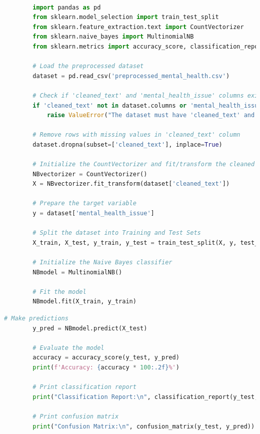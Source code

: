 \begin{tcolorbox}[colback=gray!5!white, colframe=gray!80!black, boxrule=0.5pt, title=Naive Bayes for Mental Health Classification]
    \begin{lstlisting}[language=Python]

        import pandas as pd
        from sklearn.model_selection import train_test_split
        from sklearn.feature_extraction.text import CountVectorizer
        from sklearn.naive_bayes import MultinomialNB
        from sklearn.metrics import accuracy_score, classification_report, confusion_matrix
        
        # Load the preprocessed dataset
        dataset = pd.read_csv('preprocessed_mental_health.csv')
        
        # Check if 'cleaned_text' and 'mental_health_issue' columns exist
        if 'cleaned_text' not in dataset.columns or 'mental_health_issue' not in dataset.columns:
            raise ValueError("The dataset must have 'cleaned_text' and 'mental_health_issue' columns.")
        
        # Remove rows with missing values in 'cleaned_text' column
        dataset.dropna(subset=['cleaned_text'], inplace=True)
        
        # Initialize the CountVectorizer and fit/transform the cleaned text
        NBvectorizer = CountVectorizer()
        X = NBvectorizer.fit_transform(dataset['cleaned_text'])
        
        # Prepare the target variable
        y = dataset['mental_health_issue']
        
        # Split the dataset into Training and Test Sets
        X_train, X_test, y_train, y_test = train_test_split(X, y, test_size=0.2, random_state=42)
        
        # Initialize the Naive Bayes classifier
        NBmodel = MultinomialNB()
        
        # Fit the model
        NBmodel.fit(X_train, y_train)
    \end{lstlisting}
\end{tcolorbox}

\begin{tcolorbox}[colback=gray!5!white, colframe=gray!80!black, boxrule=0.5pt, title=Naive Bayes for Mental Health Classification]
    \begin{lstlisting}[language=Python]
        # Make predictions
        y_pred = NBmodel.predict(X_test)
        
        # Evaluate the model
        accuracy = accuracy_score(y_test, y_pred)
        print(f'Accuracy: {accuracy * 100:.2f}%')
        
        # Print classification report
        print("Classification Report:\n", classification_report(y_test, y_pred))
        
        # Print confusion matrix
        print("Confusion Matrix:\n", confusion_matrix(y_test, y_pred))

    \end{lstlisting}
\end{tcolorbox}

